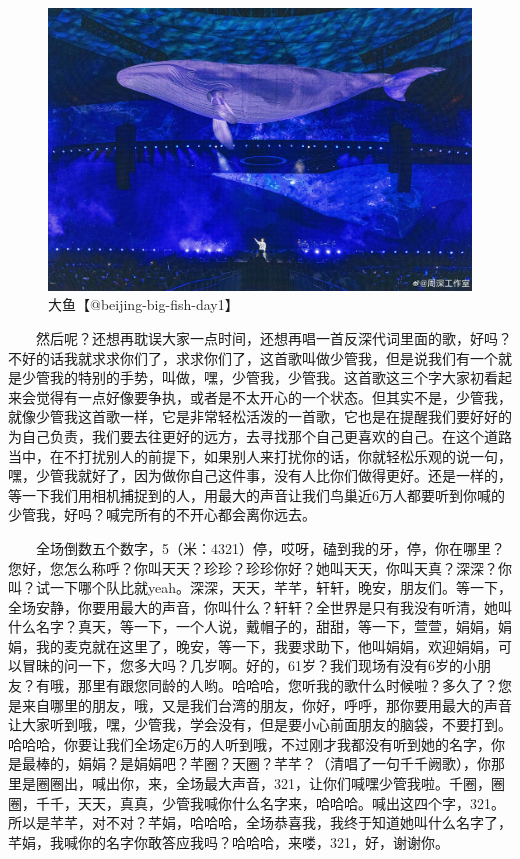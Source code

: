 \documentclass[]{ctexbook}
\begin{document}
\begin{figure}

{\centering \includegraphics[width=400pt]{img/beijing20240921/big-fish} 

}

\caption{大鱼【@beijing-big-fish-day1】}\label{fig:unnamed-chunk-102}
\end{figure}

  然后呢？还想再耽误大家一点时间，还想再唱一首反深代词里面的歌，好吗？不好的话我就求求你们了，求求你们了，这首歌叫做少管我，但是说我们有一个就是少管我的特别的手势，叫做，嘿，少管我，少管我。这首歌这三个字大家初看起来会觉得有一点好像要争执，或者是不太开心的一个状态。但其实不是，少管我，就像少管我这首歌一样，它是非常轻松活泼的一首歌，它也是在提醒我们要好好的为自己负责，我们要去往更好的远方，去寻找那个自己更喜欢的自己。在这个道路当中，在不打扰别人的前提下，如果别人来打扰你的话，你就轻松乐观的说一句，嘿，少管我就好了，因为做你自己这件事，没有人比你们做得更好。还是一样的，等一下我们用相机捕捉到的人，用最大的声音让我们鸟巢近6万人都要听到你喊的少管我，好吗？喊完所有的不开心都会离你远去。

  全场倒数五个数字，5（米：4321）停，哎呀，磕到我的牙，停，你在哪里？您好，您怎么称呼？你叫天天？珍珍？珍珍你好？她叫天天，你叫天真？深深？你叫？试一下哪个队比就yeah。深深，天天，芊芊，轩轩，晚安，朋友们。等一下，全场安静，你要用最大的声音，你叫什么？轩轩？全世界是只有我没有听清，她叫什么名字？真天，等一下，一个人说，戴帽子的，甜甜，等一下，萱萱，娟娟，娟娟，我的麦克就在这里了，晚安，等一下，我要求助下，他叫娟娟，欢迎娟娟，可以冒昧的问一下，您多大吗？几岁啊。好的，61岁？我们现场有没有6岁的小朋友？有哦，那里有跟您同龄的人哟。哈哈哈，您听我的歌什么时候啦？多久了？您是来自哪里的朋友，哦，又是我们台湾的朋友，你好，呼呼，那你要用最大的声音让大家听到哦，嘿，少管我，学会没有，但是要小心前面朋友的脑袋，不要打到。哈哈哈，你要让我们全场定6万的人听到哦，不过刚才我都没有听到她的名字，你是最棒的，娟娟？是娟娟吧？芊圈？天圈？芊芊？（清唱了一句千千阙歌），你那里是圈圈出，喊出你，来，全场最大声音，321，让你们喊嘿少管我啦。千圈，圈圈，千千，天天，真真，少管我喊你什么名字来，哈哈哈。喊出这四个字，321。所以是芊芊，对不对？芊娟，哈哈哈，全场恭喜我，我终于知道她叫什么名字了，芊娟，我喊你的名字你敢答应我吗？哈哈哈，来喽，321，好，谢谢你。
\end{document}
